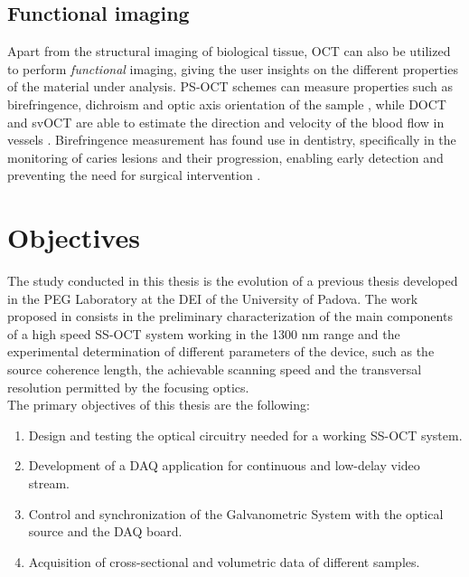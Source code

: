 \subsection{Functional imaging}
Apart from the structural imaging of biological tissue, OCT can also be utilized to perform \emph{functional} imaging, giving the user insights on the different properties of the material under analysis. \ac{PS-OCT} schemes can measure properties such as birefringence, dichroism and optic axis orientation of the sample \cite{DeBoer1997}, while \ac{DOCT} and \ac{svOCT} are able to estimate the direction and velocity of the blood flow in vessels \cite{Mahmud2013}. Birefringence measurement has found use in dentistry, specifically in the monitoring of caries lesions and their progression, enabling early detection and preventing the need for surgical intervention \cite{Fried2002}. 

\section{Objectives}
The study conducted in this thesis is the evolution of a previous thesis \cite{Calabrese2017} developed in the \ac{PEG} Laboratory at the \ac{DEI} of the University of Padova. The work proposed in \cite{Calabrese2017} consists in the preliminary characterization of the main components of a high speed \acf{SS-OCT} system working in the 1300 nm range and the experimental determination of different parameters of the device, such as the source coherence length, the achievable scanning speed and the transversal resolution permitted by the focusing optics. \\

\noindent The primary objectives of this thesis are the following:
\begin{enumerate}
	\item Design and testing the optical circuitry needed for a working SS-OCT system.
	\item Development of a \ac{DAQ} application for continuous and low-delay video stream.
	\item Control and synchronization of the Galvanometric System with the optical source and the \ac{DAQ} board. 
	\item Acquisition of cross-sectional and volumetric data of different samples.
\end{enumerate}

